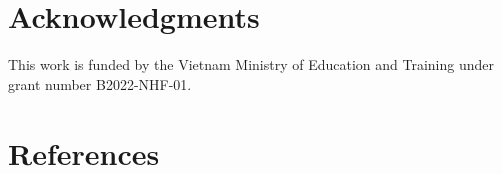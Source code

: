 \documentclass[preprint,3p]{elsarticle}
\begin{document}




%

%


\section*{Acknowledgments}
This work is funded by the Vietnam Ministry of Education and Training under grant number B2022-NHF-01.
%

\pagebreak

\section*{References}




\appendix

\end{document}
